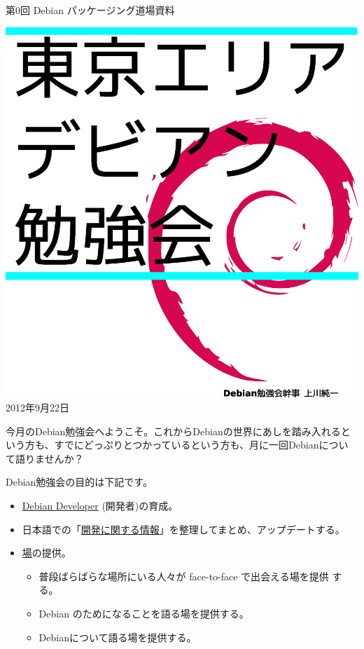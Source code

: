 \documentclass[mingoth,a4paper]{jsarticle}
\newcommand{\debmtgyear}{2012}
\newcommand{\debmtgmonth}{9}
\newcommand{\debmtgdate}{22}
\newcommand{\debmtgnumber}{0}
\begin{document}
\begin{titlepage}
\thispagestyle{empty}


\vspace*{-2cm}
第\debmtgnumber{}回 Debian パッケージング道場資料

\hspace*{-2.4cm}
\includegraphics[width=210mm]{image200801/2008title.eps}\\
\hfill{}\debmtgyear{}年\debmtgmonth{}月\debmtgdate{}日

\end{titlepage}


 今月のDebian勉強会へようこそ。これからDebianの世界にあしを踏み入れると
 いう方も、すでにどっぷりとつかっているという方も、月に一回Debianについ
 て語りませんか？

 Debian勉強会の目的は下記です。

 \begin{itemize}
 \item \underline{Debian Developer} (開発者)の育成。
 \item 日本語での「\underline{開発に関する情報}」を整理してまとめ、アップデートする。
 \item \underline{場}の提供。
 \begin{itemize}
  \item 普段ばらばらな場所にいる人々が face-to-face で出会える場を提供
	する。
  \item Debian のためになることを語る場を提供する。
  \item Debianについて語る場を提供する。
 \end{itemize}
 \end{itemize}		
\end{document}
